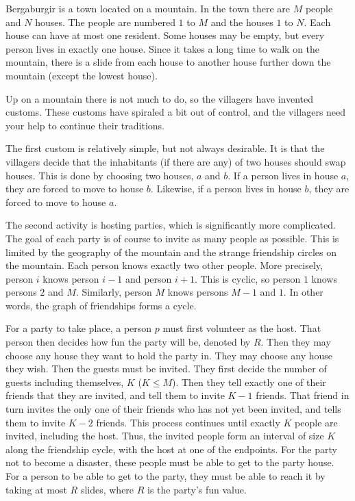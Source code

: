 Bergaburgir is a town located on a mountain.
In the town there are $M$ people and $N$ houses.
The people are numbered $1$ to $M$ and the houses $1$ to $N$.
Each house can have at most one resident.
Some houses may be empty, but every person lives in exactly one house.
Since it takes a long time to walk on the mountain, there is a slide from each house to another house further down the mountain (except the lowest house).

Up on a mountain there is not much to do, so the villagers have invented customs.
These customs have spiraled a bit out of control, and the villagers need your help to continue their traditions.

The first custom is relatively simple, but not always desirable.
It is that the villagers decide that the inhabitants (if there are any) of two houses should swap houses.
This is done by choosing two houses, $a$ and $b$.
If a person lives in house $a$, they are forced to move to house $b$.
Likewise, if a person lives in house $b$, they are forced to move to house $a$.

The second activity is hosting parties, which is significantly more complicated.
The goal of each party is of course to invite as many people as possible.
This is limited by the geography of the mountain and the strange friendship circles on the mountain.
Each person knows exactly two other people.
More precisely, person $i$ knows person $i-1$ and person $i+1$.
This is cyclic, so person $1$ knows persons $2$ and $M$.
Similarly, person $M$ knows persons $M-1$ and $1$.
In other words, the graph of friendships forms a cycle.

For a party to take place, a person $p$ must first volunteer as the host.
That person then decides how fun the party will be, denoted by $R$.
Then they may choose any house they want to hold the party in.
They may choose any house they wish.
Then the guests must be invited.
They first decide the number of guests including themselves, $K$ ($K \leq M$).
Then they tell exactly one of their friends that they are invited, and tell them to invite $K-1$ friends.
That friend in turn invites the only one of their friends who has not yet been invited, and tells them to invite $K-2$ friends.
This process continues until exactly $K$ people are invited, including the host.
Thus, the invited people form an interval of size $K$ along the friendship cycle, with the host at one of the endpoints.
For the party not to become a disaster, these people must be able to get to the party house.
For a person to be able to get to the party, they must be able to reach it by taking at most $R$ slides, where $R$ is the party's fun value.

